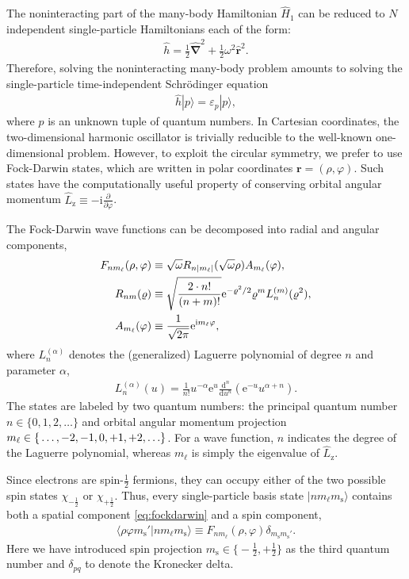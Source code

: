 The noninteracting part of the many-body Hamiltonian $\hat{H}_1$ can be reduced to $N$ independent single-particle Hamiltonians each of the form:
\begin{align*}
  \hat{h} = \frac{1}{2} \hat{\bm{\nabla}}^2 + \frac{1}{2} \omega^2 \hat{\bm{r}}^2.
\end{align*}
Therefore, solving the noninteracting many-body problem amounts to solving the single-particle time-independent Schr\"odinger equation
\begin{align*}
  \hat{h} |p\rangle = \varepsilon_p |p\rangle,
\end{align*}
where $p$ is an unknown tuple of quantum numbers.  In Cartesian coordinates, the two-dimensional harmonic oscillator is trivially reducible to the well-known one-dimensional problem.  However, to exploit the circular symmetry, we prefer to use Fock-Darwin states, which are written in polar coordinates $\bm{r} = (\rho, \varphi)$.  Such states have the computationally useful property of conserving orbital angular momentum $\hat{L}_{\mathrm{z}} \equiv -\mathrm{i} \frac{\partial}{\partial \varphi}$.

The Fock-Darwin wave functions can be decomposed into radial and angular components,\cite{lohne2010coupled}
\begin{align}
  F_{n m_\ell}(\rho, \varphi) &\equiv \sqrt\omega R_{n |m_\ell|}(\sqrt \omega \rho) A_{m_\ell}(\varphi) \label{eq:fockdarwin}, \\
  R_{n m}(\varrho) &\equiv \sqrt{\frac{2 \cdot n!}{(n + m)!}} \mathrm{e}^{-\varrho^2 / 2} \varrho^m L_n^{(m)}(\varrho^2), \notag \\
  A_{m_\ell}(\varphi) &\equiv \frac{1}{\sqrt{2 \pi}} \mathrm{e}^{\mathrm{i} m_\ell \varphi}, \notag
\end{align}
where $L_n^{(\alpha)}$ denotes the (generalized) Laguerre polynomial \cite{NIST:DLMF} of degree $n$ and parameter $\alpha$,
\begin{align*}
  L_n^{(\alpha)}(u) = \frac{1}{n!} u^{-\alpha} \mathrm{e}^u \frac{\mathrm{d}^n}{\mathrm{d} u^n} (\mathrm{e}^{-u} u^{\alpha + n}).
\end{align*}
The states are labeled by two quantum numbers: the principal quantum number $n \in \{0, 1, 2, \ldots\}$ and orbital angular momentum projection $m_\ell \in \mathbb \{\ldots, -2, -1, 0, +1, +2, \ldots\}$.  For a wave function, $n$ indicates the degree of the Laguerre polynomial, whereas $m_\ell$ is simply the eigenvalue of $\hat{L}_{\mathrm{z}}$.

Since electrons are spin-$\frac{1}{2}$ fermions, they can occupy either of the two possible spin states $\chi_{-\frac{1}{2}}$ or $\chi_{+\frac{1}{2}}$.  Thus, every single-particle basis state $|n m_\ell m_{\mathrm{s}}\rangle$ contains both a spatial component \eqref{eq:fockdarwin} and a spin component,
\begin{align} \label{eq:singleparticlestate}
  \langle \rho \varphi m_{\mathrm{s}}' |n m_\ell m_{\mathrm{s}}\rangle \equiv F_{n m_\ell}(\rho, \varphi) \delta_{m_{\mathrm{s}}^{} m_{\mathrm{s}}'}.
\end{align}
Here we have introduced spin projection $m_{\mathrm{s}} \in \bigl\{-\frac{1}{2}, +\frac{1}{2}\bigr\}$ as the third quantum number and $\delta_{p q}$ to denote the Kronecker delta.

